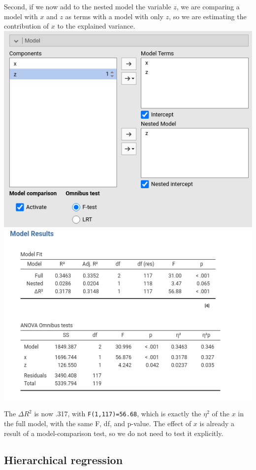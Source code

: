 \documentclass[
]{book}
\begin{document}
Second, if we now add to the nested model the variable \(z\), we are comparing a model with \(x\) and \(z\) as terms with a model with only \(z\), so we are estimating the contribution of \(x\) to the explained variance.
\includegraphics{bookletpics/2_modelcomparison_input6.png}
\includegraphics{bookletpics/2_modelcomparison_output6.png}

The \(\Delta R^2\) is now .317, with \texttt{F(1,117)=56.68}, which is exactly the \(\eta^2\) of the \(x\) in the full model, with the same F, df, and p-value. The effect of \(x\) is already a result of a model-comparison test, so we do not need to test it explicitly.

\hypertarget{hierarchical-regression}{%
\subsection{Hierarchical regression}\label{hierarchical-regression}}
\end{document}
